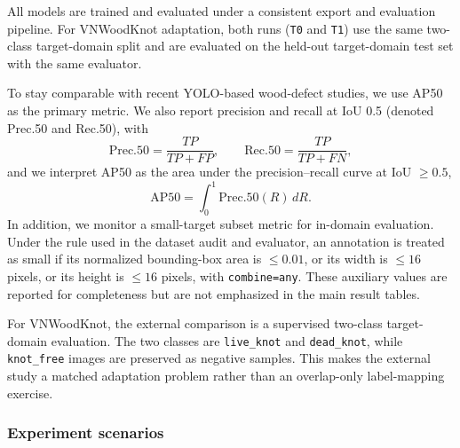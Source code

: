 \documentclass[journal,article,submit,moreauthors,pdftex]{Definitions/tsp}
\begin{document}
All models are trained and evaluated under a consistent export and evaluation pipeline. For VNWoodKnot adaptation, both runs (\texttt{T0} and \texttt{T1}) use the same two-class target-domain split and are evaluated on the held-out target-domain test set with the same evaluator.

To stay comparable with recent YOLO-based wood-defect studies, we use AP50 as the primary metric. We also report precision and recall at IoU 0.5 (denoted Prec.50 and Rec.50), with
\begin{equation}
\mathrm{Prec.50} = \frac{TP}{TP + FP},
\qquad
\mathrm{Rec.50} = \frac{TP}{TP + FN},
\end{equation}
and we interpret AP50 as the area under the precision--recall curve at IoU $\geq 0.5$,
\begin{equation}
\mathrm{AP50} = \int_{0}^{1} \mathrm{Prec.50}(R)\, dR.
\end{equation}
In addition, we monitor a small-target subset metric for in-domain evaluation. Under the rule used in the dataset audit and evaluator, an annotation is treated as small if its normalized bounding-box area is $\leq 0.01$, or its width is $\leq 16$ pixels, or its height is $\leq 16$ pixels, with \texttt{combine=any}. These auxiliary values are reported for completeness but are not emphasized in the main result tables.

For VNWoodKnot, the external comparison is a supervised two-class target-domain evaluation. The two classes are \texttt{live\_knot} and \texttt{dead\_knot}, while \texttt{knot\_free} images are preserved as negative samples. This makes the external study a matched adaptation problem rather than an overlap-only label-mapping exercise.

\subsubsection{Experiment scenarios}
\end{document}
